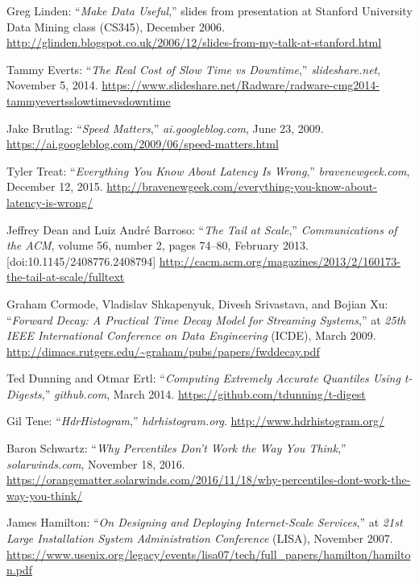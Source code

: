 \begin{thebibliography}{99}
   Greg Linden: ``\textit{Make Data Useful},'' slides from presentation at Stanford University Data Mining class (CS345), December 2006. \url{http://glinden.blogspot.co.uk/2006/12/slides-from-my-talk-at-stanford.html}

   Tammy Everts: ``\textit{The Real Cost of Slow Time vs Downtime},'' \textit{slideshare.net}, November 5, 2014. \url{https://www.slideshare.net/Radware/radware-cmg2014-tammyevertsslowtimevsdowntime}

   Jake Brutlag: ``\textit{Speed Matters},'' \textit{ai.googleblog.com}, June 23, 2009. \url{https://ai.googleblog.com/2009/06/speed-matters.html}

   Tyler Treat: ``\textit{Everything You Know About Latency Is Wrong},'' \textit{bravenewgeek.com}, December 12, 2015. \url{http://bravenewgeek.com/everything-you-know-about-latency-is-wrong/}

   Jeffrey Dean and Luiz André Barroso: ``\textit{The Tail at Scale},'' \textit{Communications of the ACM}, volume 56, number 2, pages 74–80, February 2013. [doi:10.1145/2408776.2408794] \url{http://cacm.acm.org/magazines/2013/2/160173-the-tail-at-scale/fulltext}

   Graham Cormode, Vladislav Shkapenyuk, Divesh Srivastava, and Bojian Xu: ``\textit{Forward Decay: A Practical Time Decay Model for Streaming Systems},'' at \textit{25th IEEE International Conference on Data Engineering} (ICDE), March 2009. \url{http://dimacs.rutgers.edu/~graham/pubs/papers/fwddecay.pdf}

   Ted Dunning and Otmar Ertl: ``\textit{Computing Extremely Accurate Quantiles Using t-Digests},'' \textit{github.com}, March 2014. \url{https://github.com/tdunning/t-digest}

   Gil Tene: ``\textit{HdrHistogram},'' \textit{hdrhistogram.org}. \url{http://www.hdrhistogram.org/}

   Baron Schwartz: ``\textit{Why Percentiles Don’t Work the Way You Think},'' \textit{solarwinds.com}, November 18, 2016. \url{https://orangematter.solarwinds.com/2016/11/18/why-percentiles-dont-work-the-way-you-think/}

   James Hamilton: ``\textit{On Designing and Deploying Internet-Scale Services},'' at \textit{21st Large Installation System Administration Conference} (LISA), November 2007. \url{https://www.usenix.org/legacy/events/lisa07/tech/full_papers/hamilton/hamilton.pdf}


\end{thebibliography}
